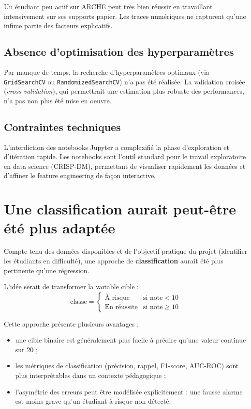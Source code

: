 \documentclass[12pt, a4paper, french]{report}
\begin{document}
Un étudiant peu actif sur ARCHE peut très bien réussir en travaillant intensivement sur ses supports papier. Les traces numériques ne capturent qu'une infime partie des facteurs explicatifs.

\subsection{Absence d'optimisation des hyperparamètres}

Par manque de temps, la recherche d'hyperparamètres optimaux
(via \texttt{GridSearchCV} ou \texttt{RandomizedSearchCV}) n'a pas été réalisée. La validation croisée (\textit{cross-validation}), qui permettrait une estimation plus robuste des performances, n'a pas non plus été mise en oeuvre.

\subsection{Contraintes techniques}

L'interdiction des notebooks Jupyter a complexifié la phase d'exploration et d'itération rapide. Les notebooks sont l'outil standard pour le travail exploratoire en data science (CRISP-DM), permettant de visualiser rapidement les données et d'affiner le feature engineering de façon interactive.

\section{Une classification aurait peut-être été plus adaptée}

Compte tenu des données disponibles et de l'objectif pratique du projet (identifier les étudiants en difficulté), une approche de \textbf{classification} aurait été plus pertinente qu'une régression.

L'idée serait de transformer la variable cible :
\begin{equation}
  \mathrm{classe} = \begin{cases}
    \text{À risque}    & \text{si } \mathrm{note} < 10 \\
    \text{En réussite} & \text{si } \mathrm{note} \geq 10
  \end{cases}
\end{equation}

\noindent Cette approche présente plusieurs avantages :
\begin{itemize}
  \item une cible binaire est généralement plus facile à prédire
        qu'une valeur continue sur 20 ;
  \item les métriques de classification (précision, rappel, F1-score, AUC-ROC) sont plus interprétables dans un contexte pédagogique ;
  \item l'asymétrie des erreurs peut être modélisée explicitement : une fausse alarme est moins grave qu'un étudiant à risque non détecté.
\end{itemize}
\end{document}
